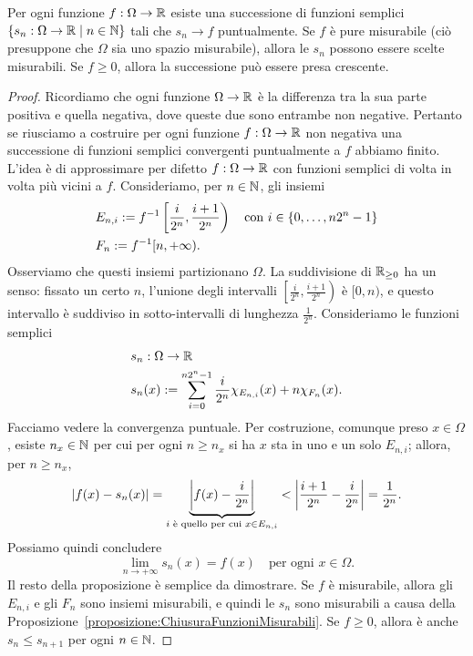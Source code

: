 \begin{lemma}\label{lemma:FunzioniRealiLimitiPuntualiDiFunzioniSemplici}
Per ogni funzione \(f : \Omega \to \mathbb R\) esiste una successione di funzioni semplici \(\left\{s_n : \Omega \to \mathbb R \mid n \in \mathbb N\right\}\) tali che \(s_n \to f\) puntualmente. Se \(f\) è pure misurabile (ciò presuppone che \(\Omega\) sia uno spazio misurabile), allora le \(s_n\) possono essere scelte misurabili. Se \(f \ge 0\), allora la successione può essere presa crescente.
\end{lemma}

\begin{proof}
Ricordiamo che ogni funzione \(\Omega \to \mathbb R\) è la differenza tra la sua parte positiva e quella negativa, dove queste due sono entrambe non negative. Pertanto se riusciamo a costruire per ogni funzione \(f : \Omega \to \mathbb R\) non negativa una successione di funzioni semplici convergenti puntualmente a \(f\) abbiamo finito. L'idea è di approssimare per difetto \(f : \Omega \to \mathbb R\) con funzioni semplici di volta in volta più vicini a \(f\). Consideriamo, per \(n \in \mathbb N\), gli insiemi
\begin{align*}
& E_{n,i} := f^{-1}\left[\frac{i}{2^n}, \frac{i+1}{2^n}\right) \quad \text{con } i \in \left\{0, \dots{}, n2^n-1\right\} \\
& F_n := f^{-1}[n, +\infty) .
\end{align*}
Osserviamo che questi insiemi partizionano \(\Omega\). La suddivisione di \(\mathbb R_{\ge 0}\) ha un senso: fissato un certo \(n\), l'unione degli intervalli \(\left[\frac{i}{2^n}, \frac{i+1}{2^n}\right)\) è \([0, n)\), e questo intervallo è suddiviso in sotto-intervalli di lunghezza \(\frac{1}{2^n}\). Consideriamo le funzioni semplici
\begin{align*}
& s_n : \Omega \to \mathbb R \\
& s_n(x) := \sum_{i=0}^{n2^n-1} \frac{i}{2^n} \chi_{E_{n, i}}(x) + n \chi_{F_n}(x) .
\end{align*}
Facciamo vedere la convergenza puntuale. Per costruzione, comunque preso \(x \in \Omega\), esiste \(n_x \in \mathbb N\) per cui per ogni \(n \ge n_x\) si ha \(x\) sta in uno e un solo \(E_{n, i}\); allora, per \(n \ge n_x\), 
\[\left\lvert f(x) - s_n(x)\right\rvert = \underbrace{\left\lvert f(x) - \frac{i}{2^n}\right\rvert}_{i \text{ è quello per cui } x \in E_{n, i}} < \left\lvert\frac{i+1}{2^n} -\frac{i}{2^n}\right\rvert = \frac{1}{2^n} .\]
Possiamo quindi concludere
\[\lim_{n \to +\infty} s_n(x) = f(x) \quad \text{per ogni } x \in \Omega .\]
Il resto della proposizione è semplice da dimostrare. Se \(f\) è misurabile, allora gli \(E_{n, i}\) e gli \(F_n\) sono insiemi misurabili, e quindi le \(s_n\) sono misurabili a causa della Proposizione~\ref{proposizione:ChiusuraFunzioniMisurabili}. Se \(f \ge 0\), allora è anche \(s_n \le s_{n+1}\) per ogni \(n \in \mathbb N\).
\end{proof}


